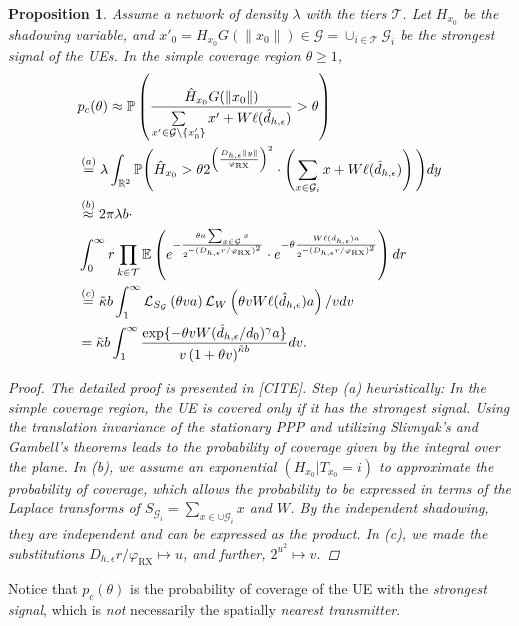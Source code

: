 \documentclass[conference]{IEEEtran}
\newcommand{\R}{\mathbb{R}}
\theoremstyle{definition}
\theoremstyle{plain}
\newtheorem{prop}[thm4]{Proposition}
\begin{document}
                    \begin{prop}
            Assume a network of density $\lambda$ with the tiers $\mathcal{T}$. Let $H_{x_0}$ be the shadowing variable, and ${x'}_0 =  H_{x_0}G(\|x_0\|) \in \mathcal{G} =\cup_{i \in \mathcal{T}} \mathcal{G}_i$ be the strongest signal of the UEs. In the simple coverage region $\theta \geq 1$,
            \begin{align}
              \label{eq:probofcov}
              &p_c(\theta) \approx \mathbb{P}\left( \frac{\hat{H}_{x_0} G(\|x_0\|)}{\sum\limits_{x' \in   \mathcal{G} \setminus \{x'_0\}}x'  + W\ell(\hat{d}_{h,\epsilon})} > \theta \right) \nonumber \\      
              &\overset{(a)}=  \lambda \int_{ \R^2}\mathbb{P}\Bigg(\hat{H}_{x_0} > \theta  2^{\left(\frac{D_{h,\epsilon}\|y\|}{\varphi_{\textup{RX}}}\right)^2 } \cdot \left(\sum_{x \in \mathcal{G}_i }x +W\ell(\hat{d}_{h,\epsilon}) \right)\Bigg) \nonumber dy  \nonumber  \\              
              &\overset{(b)}{\approx} 2 \pi \lambda b \cdot \nonumber \\
              &\int_{0}^{\infty} r \prod_{k \in \mathcal{T}}\mathbb{E} \left(e^{-\frac{\theta a \sum_{x \in { \mathcal{G}}} x}{2^{-(D_{h,\epsilon}r/\varphi_{\textup{RX}})^2}   }} \cdot e^{- \theta   \frac{W\ell(\hat{d}_{h,\epsilon})a}{2^{-(D_{h,\epsilon}r/\varphi_{\textup{RX}})^2} }} \right) dr \nonumber \\
              &\overset{(c)}{=}  \tilde{\kappa}b\int_1^{\infty} \mathcal{L}_{S_{\mathcal{G}}}\left(\theta v a \right)  \mathcal{L}_{W}\left( \theta vW\ell(\hat{d}_{h,\epsilon})a \right)/v dv \nonumber \\
              &\overset{}{=}   {} \tilde{\kappa}b\int_1^{\infty}  \frac{\exp \{- \theta v W(\hat{d}_{h,\epsilon}/d_0)^{\gamma}  a\}}{v\left(1 + \theta v  \right)^{\tilde{\kappa}b}} dv.
            \end{align}
            
            \begin{proof}
              The detailed proof is presented in [CITE]. Step (a) heuristically: In the simple coverage region, the UE is covered \textit{only if} it has the strongest signal. Using the translation invariance of the stationary PPP and utilizing Slivnyak's and Gambell's theorems leads to the probability of coverage given by the integral over the plane.
              In (b), we assume an exponential $(H_{x_0}|T_{x_0}=i)$ to approximate the probability of coverage, which allows the probability to be expressed in terms of the Laplace transforms of $S_{\mathcal{G}_i} = \sum_{x \in \cup \mathcal{G}_i}x$ and $W$. By the independent shadowing, they are independent and can be expressed as the product. In (c), we made the substitutions $D_{h,\epsilon}r/\varphi_{\text{RX}} \mapsto u$, and further, $2^{u^2} \mapsto v$.
              
            \end{proof}
          \end{prop}
          Notice that $p_c(\theta)$ is the probability of coverage of the UE with the \textit{strongest signal}, which is \textit{not} necessarily the spatially  \textit{nearest transmitter}.
\end{document}
